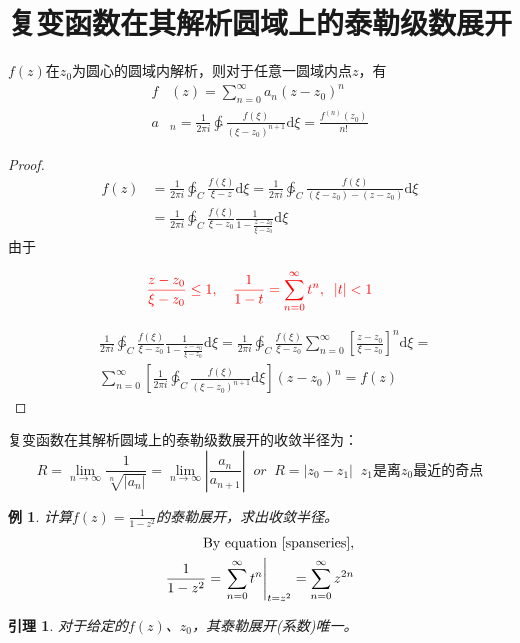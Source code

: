 \documentclass[10pt, a4paper, oneside]{ctexbook}
\newtheorem{lemma}[theorem]{引理}
\newtheorem{example}[theorem]{例}
\def\D{\mathrm{d}}
\newcommand{\F}[1][z]
{\ensuremath{f(#1)}}
\begin{document}
\section{复变函数在其解析圆域上的泰勒级数展开}
$\F$在$z_0$为圆心的圆域内解析，则对于任意一圆域内点$z$，有
\begin{align*}
    f & (z)=\sum_{n=0}^\infty a_n(z-z_0)^n                                                                 \\
    a & _n=\frac{1}{2\pi i}\ointctrclockwise \frac{\F[\xi]}{(\xi-z_0)^{n+1}}\D \xi=\frac{f^{(n)}(z_0)}{n!}
\end{align*}
\begin{proof}
    \begin{align*}
        \F & =\frac{1}{2\pi i}\ointctrclockwise_C \frac{\F[\xi]}{\xi-z}\D \xi=\frac{1}{2\pi i}\ointctrclockwise_C \frac{\F[\xi]}{(\xi-z_0)-(z-z_0)}\D \xi \\
           & =\frac{1}{2\pi i}\ointctrclockwise_C \frac{\F[\xi]}{\xi-z_0}\frac{1}{1-\frac{z-z_0}{\xi-z_0}}\D \xi
    \end{align*}
    由于


    \begin{equation}
        \label{spanseries}
        \color{red}
        \frac{z-z_0}{\xi-z_0}\le 1,\quad\frac{1}{1-t}=\sum_{n=0}^\infty t^n,\;\; |t|<1
    \end{equation}

    \begin{align*}
         & \frac{1}{2\pi i}\ointctrclockwise_C \frac{\F[\xi]}{\xi-z_0}\frac{1}{1-\frac{z-z_0}{\xi-z_0}}\D \xi=\frac{1}{2\pi i}\ointctrclockwise_C \frac{\F[\xi]}{\xi-z_0}\sum_{n=0}^\infty \left[\frac{z-z_0}{\xi-z_0}\right]^n\D \xi= \\
         & \sum_{n=0}^\infty \left[\frac{1}{2\pi i}\ointctrclockwise_C \frac{\F[\xi]}{(\xi-z_0)^{n+1}}\D \xi\right](z-z_0)^n=\F
    \end{align*}
\end{proof}
复变函数在其解析圆域上的泰勒级数展开的收敛半径为：
$$
    R=\lim_{n\to \infty}\frac{1}{\sqrt[n]{|a_n|}}=\lim_{n\to \infty} \left| \frac{a_n}{a_{n+1}} \right| \;\; or \;\; R=|z_0-z_1| \;\; \text{$z_1$是离$z_0$最近的奇点}
$$
\begin{example}
    计算$f(z)=\frac{1}{1-z^2}$的泰勒展开，求出收敛半径。
    \begin{align*}
        \rm
        \text{By equation \ref{spanseries},} \\
        \frac{1}{1-z^2}=\left. \sum_{n=0}^\infty t^n \right|_{t=z^2}=\sum_{n=0}^\infty z^{2n}
    \end{align*}
\end{example}
\begin{lemma}
    对于给定的$f(z)$、$z_0$，其泰勒展开(系数)唯一。
\end{lemma}
\end{document}
